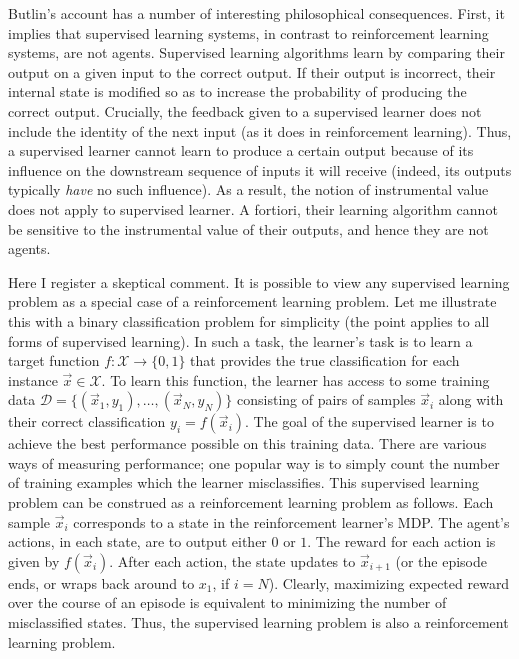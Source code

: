 Butlin's account has a number of interesting philosophical consequences.
First, it implies that supervised learning systems, in contrast to reinforcement learning systems, are not agents.
Supervised learning algorithms learn by comparing their output on a given input to the correct output.
If their output is incorrect, their internal state is modified so as to increase the probability of producing the correct output.
Crucially, the feedback given to a supervised learner does not include the identity of the next input (as it does in reinforcement learning).
Thus, a supervised learner cannot learn to produce a certain output because of its influence on the downstream sequence of inputs it will receive (indeed, its outputs typically \emph{have} no such influence).
As a result, the notion of instrumental value does not apply to supervised learner.
A fortiori, their learning algorithm cannot be sensitive to the instrumental value of their outputs, and hence they are not agents.

Here I register a skeptical comment.
It is possible to view any supervised learning problem as a special case of a reinforcement learning problem.
Let me illustrate this with a binary classification problem for simplicity (the point applies to all forms of supervised learning).
In such a task, the learner's task is to learn a target function $f : \mathcal X \rightarrow \{0, 1 \}$ that provides the true classification for each instance $\vec x \in \mathcal X$.
To learn this function, the learner has access to some training data $\mathcal D = \{ (\vec x_1, y_1), \dots, (\vec x_N, y_N) \}$ consisting of pairs of samples $\vec x_i$ along with their correct classification $y_i = f(\vec x_i)$.
The goal of the supervised learner is to achieve the best performance possible on this training data.
There are various ways of measuring performance; one popular way is to simply count the number of training examples which the learner misclassifies.
This supervised learning problem can be construed as a reinforcement learning problem as follows.
Each sample $\vec x_i$ corresponds to a state in the reinforcement learner's MDP.
The agent's actions, in each state, are to output either $0$ or $1$.
The reward for each action is given by $f(\vec x_i)$.
After each action, the state updates to $\vec x_{i + 1}$ (or the episode ends, or wraps back around to $x_1$, if $i = N$).
Clearly, maximizing expected reward over the course of an episode is equivalent to minimizing the number of misclassified states.
Thus, the supervised learning problem is also a reinforcement learning problem.

